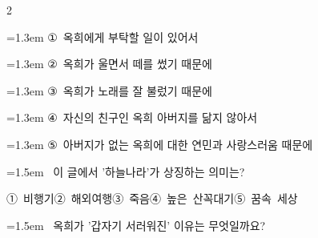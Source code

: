\documentclass[11pt, a4paper]{article}
\begin{document}
\begin{multicols}{2}
\begin{minipage}{\columnwidth}
\vspace{0.5mm}
{\hangindent=1.3em  \noindent\hspace{0.3em}①~옥희에게 부탁할 일이 있어서\par}
{\hangindent=1.3em  \noindent\hspace{0.3em}②~옥희가 울면서 떼를 썼기 때문에\par}
{\hangindent=1.3em  \noindent\hspace{0.3em}③~옥희가 노래를 잘 불렀기 때문에\par}
{\hangindent=1.3em  \noindent\hspace{0.3em}④~자신의 친구인 옥희 아버지를 닮지 않아서\par}
{\hangindent=1.3em  \noindent\hspace{0.3em}⑤~아버지가 없는 옥희에 대한 연민과 사랑스러움 때문에\par}
\vspace{4mm}
\end{minipage}
\par

\noindent\begin{minipage}{\columnwidth}
\vspace{2mm}
{\hangindent=1.5em  ~이 글에서 '하늘나라'가 상징하는 의미는?\par}

\vspace{0.5mm}
\noindent
\mbox{①~비행기}\hspace{1em}\mbox{②~해외여행}\hspace{1em}\mbox{③~죽음}\hspace{1em}\mbox{④~높은 산꼭대기}\hspace{1em}\mbox{⑤~꿈속 세상}

\vspace{4mm}
\end{minipage}
\par

\noindent\begin{minipage}{\columnwidth}
\vspace{2mm}
{\hangindent=1.5em  ~옥희가 '갑자기 서러워진' 이유는 무엇일까요?\par}


\end{minipage}
\end{multicols}
\end{document}
